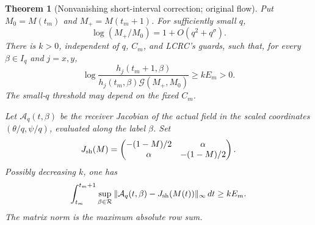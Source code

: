 \documentclass[11pt]{article}
\newtheorem{theorem}{Theorem}[section]
\theoremstyle{remark}\newtheorem{remark}[theorem]{Remark}
\newcommand{\dd}{\,d}
\newcommand{\Rhalf}{\mathcal R}
\begin{document}
\begin{theorem}[Nonvanishing short-interval correction; original flow]
\label{an02smcpv1:shortobstruction}
Put $M_0=M(t_m)$ and $M_+=M(t_m+1)$. For sufficiently small $q$,
\begin{equation}\label{an02smcpv1:shortclock}
 \log(M_+/M_0)=1+O(q^2+q^\sigma).
\end{equation}
There is $k>0$, independent of $q$, $C_m$, and LCRC's guards,
such that, for every $\beta\in I_q$ and $j=x,y$,
\begin{equation}\label{an02smcpv1:strictshape}
 \log\frac{h_j(t_m+1,\beta)}
 {h_j(t_m,\beta)\mathcal G(M_+,M_0)}
 \ge k E_m>0.
\end{equation}
The small-$q$ threshold may depend on the fixed $C_m$.

Let $\mathcal A_q(t,\beta)$ be the receiver Jacobian of the actual field
in the scaled coordinates $(\theta/q,\psi/q)$, evaluated along
the label $\beta$. Set
\[
 J_{\rm sh}(M)=
 \begin{pmatrix}-(1-M)/2&\alpha\\\alpha&-(1-M)/2\end{pmatrix}.
\]
Possibly decreasing $k$, one has
\begin{equation}\label{an02smcpv1:failedintegral}
 \int_{t_m}^{t_m+1}
 \sup_{\beta\in\Rhalf}\|\mathcal A_q(t,\beta)-J_{\rm sh}(M(t))\|_\infty\dd t
 \ge k E_m.
\end{equation}
The matrix norm is the maximum absolute row sum.
\end{theorem}
\end{document}
